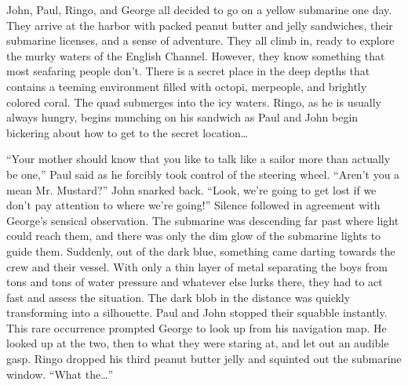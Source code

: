 \documentclass{article}
\begin{document}
John, Paul, Ringo, and George all decided to go on a yellow submarine one day.
They arrive at the harbor with packed peanut butter and jelly sandwiches,
their submarine licenses, and a sense of adventure.
They all climb in, ready to explore the murky waters of the English Channel.
However, they know something that most seafaring people don’t.
There is a secret place in the deep depths that contains a teeming environment
filled with octopi, merpeople, and brightly colored coral.
The quad submerges into the icy waters. Ringo, as he is usually always hungry,
begins munching on his sandwich as Paul and John begin bickering about how to
get to the secret location…


“Your mother should know that you like to talk like a sailor more than actually
 be one,” Paul said as he forcibly took control of the steering wheel.
 “Aren’t you a mean Mr. Mustard?” John snarked back. “Look, we’re going to get
 lost if we don’t pay attention to where we’re going!” Silence followed in agreement
 with George’s sensical observation. The submarine was descending far past where
 light could reach them, and there was only the dim glow of the submarine lights
 to guide them. Suddenly, out of the dark blue, something came darting towards the
 crew and their vessel. With only a thin layer of metal separating the boys from
 tons and tons of water pressure and whatever else lurks there, they had to act fast
 and assess the situation. The dark blob in the distance was quickly transforming
 into a silhouette. Paul and John stopped their squabble instantly. This rare
 occurrence prompted George to look up from his navigation map. He looked up at the two,
 then to what they were staring at, and let out an audible gasp. Ringo dropped his
 third peanut butter jelly and squinted out the submarine window. “What the…”
\end{document}
